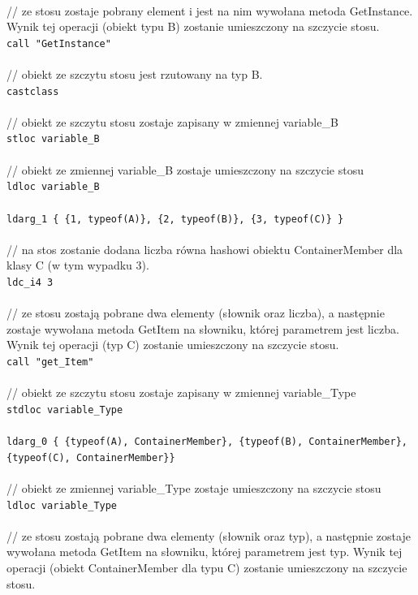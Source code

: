 \documentclass[12pt]{article}
\begin{document}
\\
// ze stosu zostaje pobrany element i jest na nim wywołana metoda GetInstance. Wynik tej operacji (obiekt typu B) zostanie umieszczony na szczycie stosu.\\
\texttt{call "GetInstance"}\\
\\
// obiekt ze szczytu stosu jest rzutowany na typ B.\\
\texttt{castclass}\\
\\
// obiekt ze szczytu stosu zostaje zapisany w zmiennej variable\_B\\
\texttt{stloc variable\_B}\\
\\
// obiekt ze zmiennej variable\_B zostaje umieszczony na szczycie stosu\\
\texttt{ldloc variable\_B}\\
\\
\texttt{ldarg\_1 \{ \{1, typeof(A)\}, \{2, typeof(B)\}, \{3, typeof(C)\} \}}\\
\\
// na stos zostanie dodana liczba równa hashowi obiektu ContainerMember dla klasy C (w tym wypadku 3).\\
\texttt{ldc\_i4 3}\\
\\
// ze stosu zostają pobrane dwa elementy (słownik oraz liczba), a następnie zostaje wywołana metoda GetItem na słowniku, której parametrem jest liczba. Wynik tej operacji (typ C) zostanie umieszczony na szczycie stosu.\\
\texttt{call "get\_Item"}\\
\\
// obiekt ze szczytu stosu zostaje zapisany w zmiennej variable\_Type\\
\texttt{stdloc variable\_Type}\\
\\
\texttt{ldarg\_0 \{ \{typeof(A), ContainerMember\}, \{typeof(B), ContainerMember\}, \{typeof(C), ContainerMember\}\}}\\
\\
// obiekt ze zmiennej variable\_Type zostaje umieszczony na szczycie stosu\\
\texttt{ldloc variable\_Type}\\
\\
\newpage
// ze stosu zostają pobrane dwa elementy (słownik oraz typ), a następnie zostaje wywołana metoda GetItem na słowniku, której parametrem jest typ. Wynik tej operacji (obiekt ContainerMember dla typu C) zostanie umieszczony na szczycie stosu.\\
\end{document}
